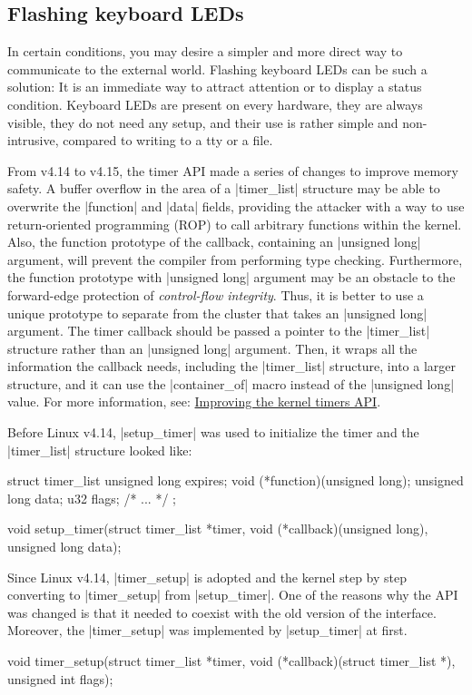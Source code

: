 \documentclass[10pt, oneside]{book}
\begin{document}
\subsection{Flashing keyboard LEDs}
\label{sec:flash_kb_led}
In certain conditions, you may desire a simpler and more direct way to communicate to the external world.
Flashing keyboard LEDs can be such a solution: It is an immediate way to attract attention or to display a status condition.
Keyboard LEDs are present on every hardware, they are always visible, they do not need any setup, and their use is rather simple and non-intrusive, compared to writing to a tty or a file.

From v4.14 to v4.15, the timer API made a series of changes to improve memory safety.
A buffer overflow in the area of a \cpp|timer_list| structure may be able to overwrite the \cpp|function| and \cpp|data| fields, providing the attacker with a way to use return-oriented programming (ROP) to call arbitrary functions within the kernel.
Also, the function prototype of the callback, containing an \cpp|unsigned long| argument, will prevent the compiler from performing type checking.
Furthermore, the function prototype with \cpp|unsigned long| argument may be an obstacle to the forward-edge protection of \textit{control-flow integrity}.
Thus, it is better to use a unique prototype to separate from the cluster that takes an \cpp|unsigned long| argument.
The timer callback should be passed a pointer to the \cpp|timer_list| structure rather than an \cpp|unsigned long| argument.
Then, it wraps all the information the callback needs, including the \cpp|timer_list| structure, into a larger structure, and it can use the \cpp|container_of| macro instead of the \cpp|unsigned long| value.
For more information, see: \href{https://lwn.net/Articles/735887/}{Improving the kernel timers API}.

Before Linux v4.14, \cpp|setup_timer| was used to initialize the timer and the \cpp|timer_list| structure looked like:
\begin{code}
struct timer_list {
    unsigned long expires;
    void (*function)(unsigned long);
    unsigned long data;
    u32 flags;
    /* ... */
};

void setup_timer(struct timer_list *timer, void (*callback)(unsigned long),
                 unsigned long data);
\end{code}

Since Linux v4.14, \cpp|timer_setup| is adopted and the kernel step by step converting to \cpp|timer_setup| from \cpp|setup_timer|.
One of the reasons why the API was changed is that it needed to coexist with the old version of the interface.
Moreover, the \cpp|timer_setup| was implemented by \cpp|setup_timer| at first.
\begin{code}
void timer_setup(struct timer_list *timer,
                 void (*callback)(struct timer_list *), unsigned int flags);
\end{code}
\end{document}
